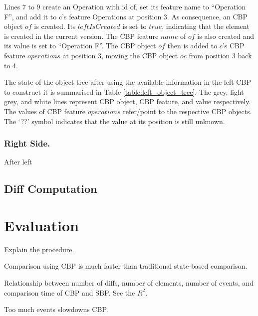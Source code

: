 \documentclass{llncs}
\begin{document}
Lines 7 to 9 create an \textsf{Operation} with id \textsf{of}, set its feature \textsf{name} to ``Operation F'', and add it to \textsf{c}'s feature \textsf{Operations} at position 3. As consequence, an CBP object $of$ is created. Its $leftIsCreated$ is set to $true$, indicating that the element is created in the current version. The CBP feature $name$ of $of$ is also created and its value is set to ``Operation F''. The CBP object $of$ then is added to $c$'s CBP feature $operations$ at position 3, moving the CBP object $oc$ from position 3 back to 4. 

The state of the object tree after using the available information in the left CBP to construct it is summarised in Table \ref{table:left_object_tree}. The grey, light grey, and white lines represent CBP object, CBP feature, and value respectively. The values of CBP feature $operations$ refer/point to the respective CBP objects. The `??' symbol indicates that the value at its position is still unknown.

\subsubsection{Right Side.} \label{sec:right_side} After left

\subsection{Diff Computation}
\label{sec:diff_computation}

\section{Evaluation}
\label{sec:evaluation}

Explain the procedure.

Comparison using CBP is much faster than traditional state-based comparison.

Relationship between number of diffs, number of elements, number of events, and comparison time of CBP and SBP. See the $R^2$.

Too much events slowdowns CBP.
 
\end{document}
